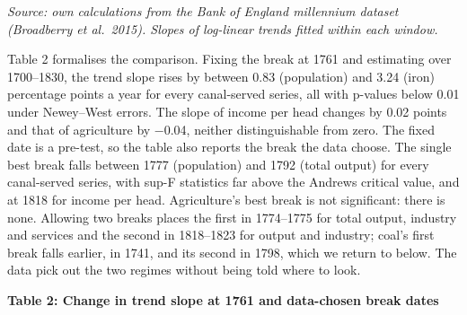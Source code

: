 \documentclass[
  11pt,
]{article}
\newcounter{none} %
\begin{document}
\emph{Source: own calculations from the Bank of England millennium
dataset (Broadberry et al.~2015). Slopes of log-linear trends fitted
within each window.}

Table 2 formalises the comparison. Fixing the break at 1761 and
estimating over 1700--1830, the trend slope rises by between 0.83
(population) and 3.24 (iron) percentage points a year for every
canal-served series, all with p-values below 0.01 under Newey--West
errors. The slope of income per head changes by 0.02 points and that of
agriculture by −0.04, neither distinguishable from zero. The fixed date
is a pre-test, so the table also reports the break the data choose. The
single best break falls between 1777 (population) and 1792 (total
output) for every canal-served series, with sup-F statistics far above
the Andrews critical value, and at 1818 for income per head.
Agriculture's best break is not significant: there is none. Allowing two
breaks places the first in 1774--1775 for total output, industry and
services and the second in 1818--1823 for output and industry; coal's
first break falls earlier, in 1741, and its second in 1798, which we
return to below. The data pick out the two regimes without being told
where to look.

\textbf{Table 2: Change in trend slope at 1761 and data-chosen break
dates}
\end{document}
